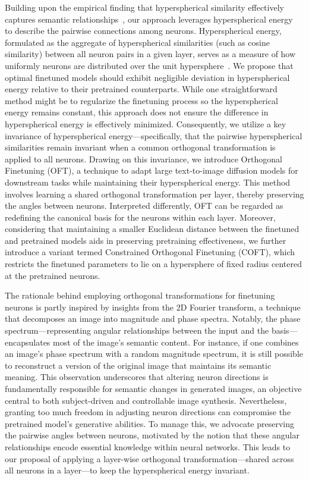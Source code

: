 Building upon the empirical finding that hyperspherical similarity effectively captures semantic relationships~\cite{liu2017deep,liu2018decoupled,chen2020angular}, our approach leverages hyperspherical energy~\cite{liu2018learning} to describe the pairwise connections among neurons. Hyperspherical energy, formulated as the aggregate of hyperspherical similarities (such as cosine similarity) between all neuron pairs in a given layer, serves as a measure of how uniformly neurons are distributed over the unit hypersphere~\cite{liu2021learning}. We propose that optimal finetuned models should exhibit negligible deviation in hyperspherical energy relative to their pretrained counterparts. While one straightforward method might be to regularize the finetuning process so the hyperspherical energy remains constant, this approach does not ensure the difference in hyperspherical energy is effectively minimized. Consequently, we utilize a key invariance of hyperspherical energy—specifically, that the pairwise hyperspherical similarities remain invariant when a common orthogonal transformation is applied to all neurons. Drawing on this invariance, we introduce Orthogonal Finetuning (OFT), a technique to adapt large text-to-image diffusion models for downstream tasks while maintaining their hyperspherical energy. This method involves learning a shared orthogonal transformation per layer, thereby preserving the angles between neurons. Interpreted differently, OFT can be regarded as redefining the canonical basis for the neurons within each layer. Moreover, considering that maintaining a smaller Euclidean distance between the finetuned and pretrained models aids in preserving pretraining effectiveness, we further introduce a variant termed Constrained Orthogonal Finetuning (COFT), which restricts the finetuned parameters to lie on a hypersphere of fixed radius centered at the pretrained neurons.

The rationale behind employing orthogonal transformations for finetuning neurons is partly inspired by insights from the 2D Fourier transform, a technique that decomposes an image into magnitude and phase spectra. Notably, the phase spectrum—representing angular relationships between the input and the basis—encapsulates most of the image's semantic content. For instance, if one combines an image's phase spectrum with a random magnitude spectrum, it is still possible to reconstruct a version of the original image that maintains its semantic meaning. This observation underscores that altering neuron directions is fundamentally responsible for semantic changes in generated images, an objective central to both subject-driven and controllable image synthesis. Nevertheless, granting too much freedom in adjusting neuron directions can compromise the pretrained model’s generative abilities. To manage this, we advocate preserving the pairwise angles between neurons, motivated by the notion that these angular relationships encode essential knowledge within neural networks. This leads to our proposal of applying a layer-wise orthogonal transformation—shared across all neurons in a layer—to keep the hyperspherical energy invariant.

